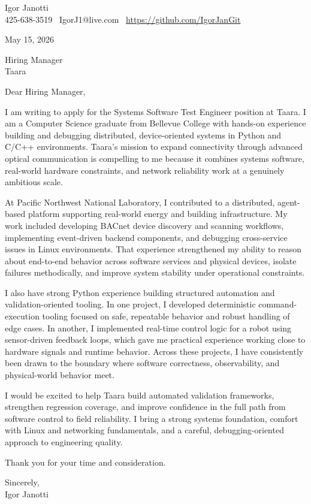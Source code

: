 \documentclass[11pt]{article}
\begin{document}
Igor Janotti\\
425-638-3519 \textbar\ IgorJ1@live.com \textbar\ \url{https://github.com/IgorJanGit}

May 15, 2026

Hiring Manager\\
Taara

Dear Hiring Manager,

I am writing to apply for the Systems Software Test Engineer position at Taara. I am a Computer Science graduate from Bellevue College with hands-on experience building and debugging distributed, device-oriented systems in Python and C/C++ environments. Taara's mission to expand connectivity through advanced optical communication is compelling to me because it combines systems software, real-world hardware constraints, and network reliability work at a genuinely ambitious scale.

At Pacific Northwest National Laboratory, I contributed to a distributed, agent-based platform supporting real-world energy and building infrastructure. My work included developing BACnet device discovery and scanning workflows, implementing event-driven backend components, and debugging cross-service issues in Linux environments. That experience strengthened my ability to reason about end-to-end behavior across software services and physical devices, isolate failures methodically, and improve system stability under operational constraints.

I also have strong Python experience building structured automation and validation-oriented tooling. In one project, I developed deterministic command-execution tooling focused on safe, repeatable behavior and robust handling of edge cases. In another, I implemented real-time control logic for a robot using sensor-driven feedback loops, which gave me practical experience working close to hardware signals and runtime behavior. Across these projects, I have consistently been drawn to the boundary where software correctness, observability, and physical-world behavior meet.

I would be excited to help Taara build automated validation frameworks, strengthen regression coverage, and improve confidence in the full path from software control to field reliability. I bring a strong systems foundation, comfort with Linux and networking fundamentals, and a careful, debugging-oriented approach to engineering quality.

Thank you for your time and consideration.

Sincerely,\\
Igor Janotti
\end{document}
